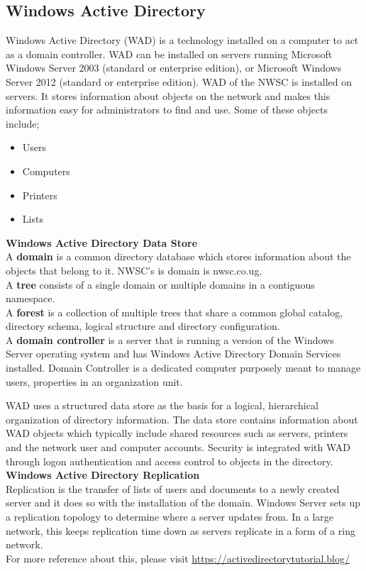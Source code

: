 \documentclass{article}
\begin{document}
\subsection{Windows Active Directory}\cite{desmond2008active}
Windows Active Directory (WAD) is a technology installed on a computer to act as a domain controller. WAD can be installed on servers running Microsoft Windows Server 2003 (standard or enterprise edition), or Microsoft Windows Server 2012 (standard or enterprise edition). WAD of the NWSC is installed on servers. It stores information about objects on the network and makes this information easy for administrators to find and use. Some of these objects include;
\begin{itemize}
\item Users
\item  Computers
\item Printers
\item Lists
\end{itemize}
\textbf{Windows Active Directory Data Store}\\
A \textbf{domain} is a common directory database which stores information about the objects that
belong to it. NWSC's is domain is nwsc.co.ug.\\
A \textbf{tree} consists of a single domain or multiple domains in a contiguous namespace.\\
A \textbf{forest} is a collection of multiple trees that share a common global catalog, directory schema, logical structure and directory configuration.\\
A \textbf{domain controller} is a server that is running a version of the Windows Server operating system and has Windows Active Directory Domain Services installed. Domain Controller is a dedicated computer purposely meant to manage users, properties in an organization unit.
\par WAD uses a structured data store as the basis for a logical, hierarchical organization of directory information. The data store contains information about WAD objects which typically include shared resources such as servers, printers and the network user and computer accounts. Security is integrated with WAD through logon authentication and access control to objects in the directory.\\
\textbf{Windows Active Directory Replication}\\
Replication is the transfer of lists of users and documents to a newly created server and it does so with the installation of the domain. Windows Server sets up a replication topology to determine where a server updates from. In a large network, this keeps replication time down as servers replicate in a form of a ring network.\\
For more reference about this, please visit \url{https://activedirectorytutorial.blog/}
\end{document}
